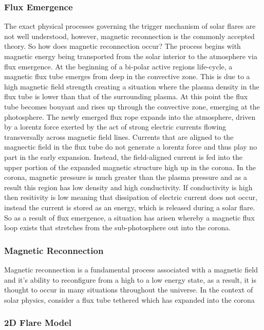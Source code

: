 \subsubsection{Flux Emergence}
The exact physical processes governing the trigger mechanism of solar flares are not well understood, however, magnetic reconnection is the commonly accepted theory. So how does magnetic reconnection occur? The process begins with magnetic energy being transported from the solar interior to the atmosphere via flux emergence. At the beginning of a bi-polar active regions life-cycle, a magnetic flux tube emerges from deep in the convective zone. This is due to a high magnetic field strength creating a situation where the plasma density in the flux tube is lower than that of the surrounding plasma. At this point the flux tube becomes bouyant and rises up through the convective zone, emerging at the photosphere. The newly emerged flux rope expands into the atmosphere, driven by a lorentz force exerted by the act of strong electric currents flowing transversally across magnetic field lines. Currents that are aligned to the magnectic field in the flux tube do not generate a lorentz force and thus play no part in the early expansion. Instead, the field-aligned current is fed into the upper portion of the expanded magnetic structure high up in the corona. In the corona, magnetic pressure is much greater than the plasma pressure and as a result this region has low density and high conductivity. If conductivity is high then resitivity is low meaning that dissipation of electric current does not occur, instead the current is stored as an energy, which is released during a solar flare. So as a result of flux emergence, a situation has arisen whereby a magnetic flux loop exists that stretches from the sub-photosphere out into the corona. 

\subsubsection{Magnetic Reconnection}
Magnetic reconnection is a fundamental process associated with a magnetic field and it's ability to reconfigure from a high to a low energy state, as a result, it is thought to occur in many situations throughout the universe. In the context of solar physics, consider a flux tube tethered which has expanded into the corona   


\subsubsection{2D Flare Model}


